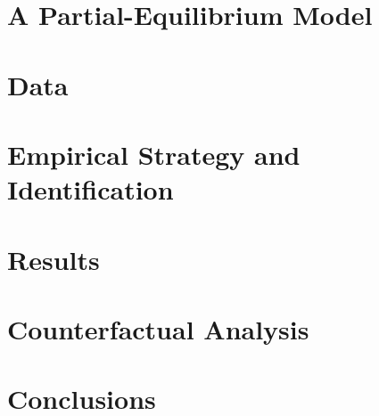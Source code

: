 \documentclass{article}
\begin{document}
\section{A Partial-Equilibrium Model}\label{sec:model}
    

\section{Data}\label{sec:data}
    

\section{Empirical Strategy and Identification}\label{sec:empirical_strategy}
    

\section{Results}\label{sec:results}
    

\section{Counterfactual Analysis}\label{sec:counterfactual}
    

\section{Conclusions}\label{sec:conclusion}
    



\clearpage
\printbibliography

\clearpage

\clearpage



\clearpage

\section*{}
\vspace{5mm}

\appendix

\renewcommand\thetable{\thesection.\arabic{table}}    
\renewcommand\thefigure{\thesection.\arabic{figure}} 
\setcounter{table}{0}
\setcounter{figure}{0}


\end{document}
